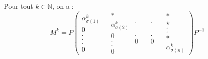 Pour tout $k \in \mathbb{N}$, on a :
\[ M^k = P \left( \begin{array}{c}
     \alpha^k_{\sigma (1)}\\
     0\\
     .\\
     .\\
     .\\
     0
   \end{array} \begin{array}{c}
     \\
     
   \end{array} \begin{array}{c}
     \ast\\
     \alpha^k_{\sigma (2)}\\
     0\\
     .\\
     .\\
     0
   \end{array}  \begin{array}{c}
     .\\
     \\
     \\
     \\
     .\\
     0
   \end{array} \quad \begin{array}{c}
     .\\
     \\
     \\
     \\
     .\\
     0
   \end{array} \quad \begin{array}{l}
     \ast\\
     \star\\
     .\\
     .\\
     \ast\\
     \alpha^k_{\sigma (n)}
   \end{array} \right) P^{- 1} \]


